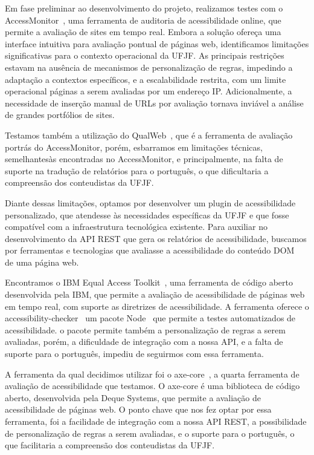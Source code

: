 \documentclass[12pt]{article}
\begin{document}
Em fase preliminar ao desenvolvimento do projeto, realizamos testes com o
AccessMonitor~\autocite{AM},
uma ferramenta de auditoria de acessibilidade online, que permite a avaliação de
sites em tempo real. Embora a solução ofereça uma interface intuitiva para
avaliação pontual de páginas web, identificamos limitações significativas para o
contexto operacional da UFJF. As principais restrições estavam na ausência de
mecanismos de personalização de regras, impedindo a adaptação a contextos
específicos, e a escalabilidade restrita, com um limite operacional páginas a
serem avaliadas por um endereço IP\@. Adicionalmente, a necessidade de inserção
manual de URLs por avaliação tornava inviável a análise de grandes portfólios de
sites\@.

Testamos também a utilização do QualWeb~\autocite{qualweb}, que é a ferramenta
de avaliação portrás do AccessMonitor, porém, esbarramos em limitações técnicas,
semelhantesàs encontradas no AccessMonitor, e principalmente, na falta de suporte
na tradução de relatórios para o português, o que dificultaria a compreensão dos
conteudistas da UFJF\@.

Diante dessas limitações, optamos por desenvolver um plugin de acessibilidade
personalizado, que atendesse às necessidades específicas da UFJF e que fosse
compatível com a infraestrutura tecnológica existente. Para auxiliar no
desenvolvimento da API REST que gera os relatórios de acessibilidade,
buscamos por ferramentas e tecnologias que avaliasse a acessibilidade
do conteúdo DOM~\autocite{DOM} de uma página web.

Encontramos o IBM Equal Access Toolkit~\autocite{IBMa}, uma ferramenta de código
aberto desenvolvida pela IBM, que permite a avaliação de acessibilidade de páginas
web em tempo real, com suporte as diretrizes de acessibilidade. A ferramenta oferece
o accessibility-checker~\autocite{AC} um pacote Node~\autocite{Node} que permite a
testes automatizados de acessibilidade. o pacote permite também a personalização de
regras a serem avaliadas,
porém, a dificuldade de integração com a nossa API, e a falta de suporte para o
português, impediu de seguirmos com essa ferramenta.

A ferramenta da qual decidimos utilizar foi o axe-core~\autocite{axecore}, a quarta
ferramenta de avaliação de acessibilidade que testamos. O axe-core é uma biblioteca
de código aberto, desenvolvida pela Deque Systems, que permite a avaliação de acessibilidade
de páginas web. O ponto chave que nos fez optar por essa ferramenta, foi a facilidade
de integração com a nossa API REST, a possibilidade de personalização de regras a serem
avaliadas, e o suporte para o português, o que facilitaria a compreensão dos conteudistas
da UFJF\@.
\end{document}
